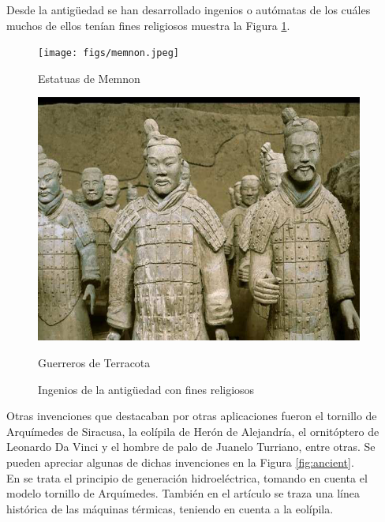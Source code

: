 Desde la antigüedad se han desarrollado ingenios o autómatas de los cuáles muchos de ellos tenían fines religiosos  muestra la Figura \ref{fig:ancientrel}.   \\


\begin{figure}[ht!]
	\centering
	\begin{minipage}{0.4\linewidth}
		\centering
		\texttt{[image: figs/memnon.jpeg]}
		\caption*{\centering Estatuas de Memnon} %
	\end{minipage}
	\hspace{2cm}
	\begin{minipage}{0.35\linewidth}
		\centering
		\includegraphics[width=\linewidth]{figs/terracota.png}
		\caption*{\centering Guerreros de Terracota} %
	\end{minipage}
	\caption{Ingenios de la antigüedad con fines religiosos}
	\label{fig:ancientrel}
\end{figure}

 
Otras invenciones que destacaban por otras aplicaciones fueron el tornillo de Arquímedes de Siracusa, la eolípila de Herón de Alejandría, el ornitóptero de Leonardo Da Vinci y el hombre de palo de Juanelo Turriano, entre otras. Se pueden apreciar algunas de dichas invenciones en la Figura \ref{fig:ancient}.\\

En \cite{cuenca2023diseno} se trata el principio de generación hidroeléctrica, tomando en cuenta el modelo tornillo de Arquímedes. También en el artículo \cite{giri2020maquinas} se traza una línea histórica de las máquinas térmicas, teniendo en cuenta a la eolípila. 

